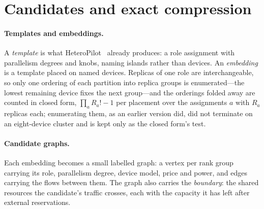 \section{Candidates and exact compression}
\label{sec:candidates}

\paragraph{Templates and embeddings.}
A \emph{template} is what HeteroPilot~\cite{heteropilot} already produces: a role
assignment with parallelism degrees and knobs, naming islands rather than
devices. An \emph{embedding} is a template placed on named devices. Replicas of
one role are interchangeable, so only one ordering of each partition into
replica groups is enumerated---the lowest remaining device fixes the next
group---and the orderings folded away are counted in closed form,
$\prod_a R_a! - 1$ per placement over the assignments $a$ with $R_a$ replicas
each; enumerating them, as an earlier version did, did not terminate on an
eight-device cluster and is kept only as the closed form's test.

\paragraph{Candidate graphs.}
Each embedding becomes a small labelled graph: a vertex per rank group carrying
its role, parallelism degree, device model, price and power, and edges carrying
the flows between them. The graph also carries the \emph{boundary}: the shared
resources the candidate's traffic crosses, each with the capacity it has left
after external reservations.

